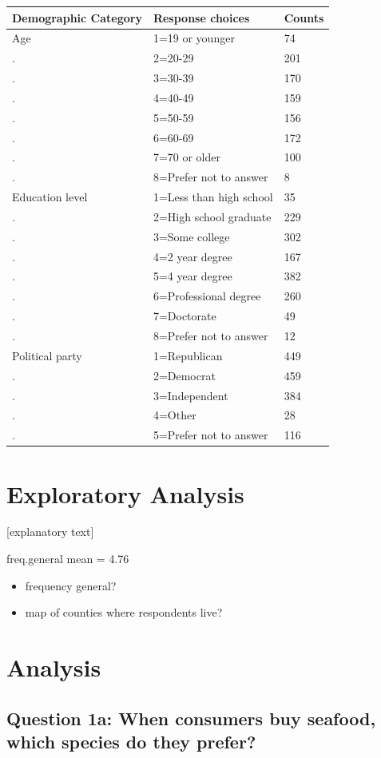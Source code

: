 \documentclass[
  12pt,
]{article}
\providecommand{\tightlist}{%
  \setlength{\itemsep}{0pt}\setlength{\parskip}{0pt}}
\begin{document}
\begin{longtable}[]{@{}lll@{}}
\toprule
Demographic Category & Response choices & Counts\tabularnewline
\midrule
\endhead
Age & 1=19 or younger & 74\tabularnewline
. & 2=20-29 & 201\tabularnewline
. & 3=30-39 & 170\tabularnewline
. & 4=40-49 & 159\tabularnewline
. & 5=50-59 & 156\tabularnewline
. & 6=60-69 & 172\tabularnewline
. & 7=70 or older & 100\tabularnewline
. & 8=Prefer not to answer & 8\tabularnewline
Education level & 1=Less than high school & 35\tabularnewline
. & 2=High school graduate & 229\tabularnewline
. & 3=Some college & 302\tabularnewline
. & 4=2 year degree & 167\tabularnewline
. & 5=4 year degree & 382\tabularnewline
. & 6=Professional degree & 260\tabularnewline
. & 7=Doctorate & 49\tabularnewline
. & 8=Prefer not to answer & 12\tabularnewline
Political party & 1=Republican & 449\tabularnewline
. & 2=Democrat & 459\tabularnewline
. & 3=Independent & 384\tabularnewline
. & 4=Other & 28\tabularnewline
. & 5=Prefer not to answer & 116\tabularnewline
\bottomrule
\end{longtable}

\newpage

\hypertarget{exploratory-analysis}{%
\section{Exploratory Analysis}\label{exploratory-analysis}}

{[}explanatory text{]}

freq.general mean = 4.76

\begin{itemize}
\tightlist
\item
  frequency general?
\item
  map of counties where respondents live?
\end{itemize}

\newpage

\hypertarget{analysis}{%
\section{Analysis}\label{analysis}}

\hypertarget{question-1a-when-consumers-buy-seafood-which-species-do-they-prefer}{%
\subsection{Question 1a: When consumers buy seafood, which species do
they
prefer?}\label{question-1a-when-consumers-buy-seafood-which-species-do-they-prefer}}
\end{document}
